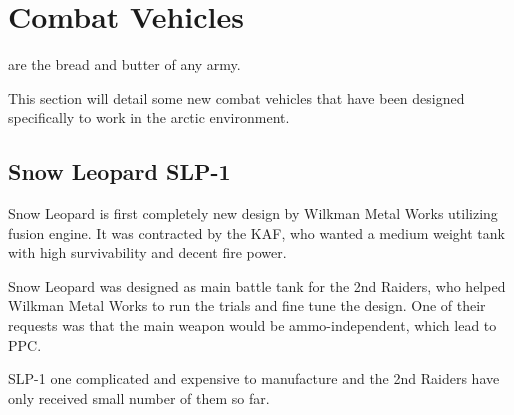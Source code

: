 \documentclass{tufte-book}
\begin{document}
\chapter{Combat Vehicles}
\label{ch:combat-vehicles}


 are the bread and butter of any army.

This section will detail some new combat vehicles that have been
designed specifically to work in the arctic environment.


\section{Snow Leopard SLP-1}

 Snow Leopard is first completely new design
by Wilkman Metal Works utilizing fusion engine. It was contracted by the KAF,
who wanted a medium weight tank with high survivability and decent fire power.

Snow Leopard was designed as main battle tank for the 2nd Raiders, who helped
Wilkman Metal Works to run the trials and fine tune the design. One of their
requests was that the main weapon would be ammo-independent, which lead to
PPC.

SLP-1 one complicated and expensive to manufacture and the 2nd Raiders have
only received small number of them so far.
\end{document}
